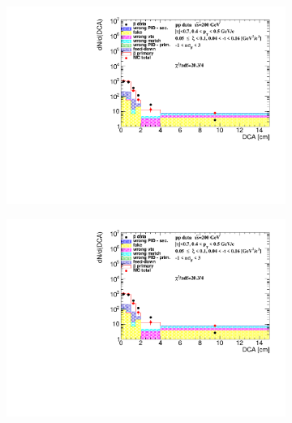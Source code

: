 \begin{figure}[h!]
\begin{subfigure}{.45\textwidth}
	\end{subfigure}
	\begin{subfigure}{.45\textwidth}
		\includegraphics[width=\linewidth, page=10]{chapters/chrgSTAR/img/DCAproton/background_p_bar_1.pdf}
	\end{subfigure}
	\begin{subfigure}{.45\textwidth}
		\includegraphics[width=\linewidth, page=13]{chapters/chrgSTAR/img/DCAproton/background_p_bar_1.pdf}
	\end{subfigure}
	\begin{subfigure}{.45\textwidth}

\end{subfigure}
\end{figure}
